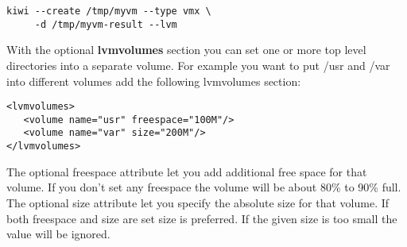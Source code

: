 \begin{Command}{12cm}
\begin{verbatim}
kiwi --create /tmp/myvm --type vmx \
     -d /tmp/myvm-result --lvm
\end{verbatim}
\end{Command}

With the optional \textbf{lvmvolumes} section you can set one or
more top level directories into a separate volume. For example you
want to put /usr and /var into different volumes add the following
lvmvolumes section:

\begin{Command}{12cm}
\begin{verbatim}
<lvmvolumes>
   <volume name="usr" freespace="100M"/>
   <volume name="var" size="200M"/>
</lvmvolumes>
\end{verbatim}
\end{Command}

The optional freespace attribute let you add additional free space
for that volume. If you don't set any freespace the volume will be
about 80\% to 90\% full. The optional size attribute let you specify
the absolute size for that volume. If both freespace and size are set
size is preferred. If the given size is too small the value will be
ignored.
